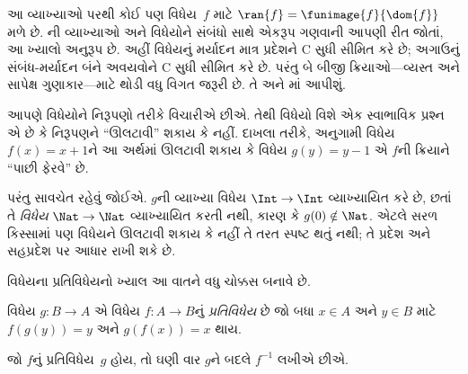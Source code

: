\begin{explain}
આ વ્યાખ્યાઓ પરથી કોઈ પણ વિધેય~$f$ માટે
$\ran{f} =
\funimage{f}{\dom{f}}$ મળે છે.
ની
વ્યાખ્યાઓ અને વિધેયોને સંબંધો સાથે એકરૂપ ગણવાની આપણી
રીત જોતાં, આ ખ્યાલો અનુરૂપ છે. અહીં વિધેયનું મર્યાદન
માત્ર પ્રદેશને C સુધી સીમિત કરે છે; અગાઉનું સંબંધ-મર્યાદન
બંને અવયવોને C સુધી સીમિત કરે છે. પરંતુ બે બીજી
ક્રિયાઓ---વ્યસ્ત અને સાપેક્ષ ગુણાકાર---માટે થોડી વધુ
વિગત જરૂરી છે. તે  અને
માં આપીશું.
\end{explain}
\endgroup


\begingroup
\makeatletter{}\makeatother

\label{guunit:OLP-0024}


\begin{explain}
આપણે વિધેયોને નિરૂપણો તરીકે વિચારીએ છીએ. તેથી વિધેયો
વિશે એક સ્વાભાવિક પ્રશ્ન એ છે કે નિરૂપણને “ઊલટાવી”
શકાય કે નહીં. દાખલા તરીકે, અનુગામી વિધેય
$f(x) = x + 1$ને આ અર્થમાં ઊલટાવી શકાય કે વિધેય
$g(y) = y - 1$ એ $f$ની ક્રિયાને “પાછી ફેરવે” છે.

પરંતુ સાવચેત રહેવું જોઈએ. $g$ની વ્યાખ્યા વિધેય
$\Int \to \Int$ વ્યાખ્યાયિત કરે છે, છતાં તે
\emph{વિધેય} $\Nat
\to \Nat$ વ્યાખ્યાયિત કરતી નથી, કારણ કે
$g(0) \notin \Nat$. એટલે સરળ કિસ્સામાં પણ વિધેયને
ઊલટાવી શકાય કે નહીં તે તરત સ્પષ્ટ થતું નથી;
તે પ્રદેશ અને સહપ્રદેશ પર આધાર રાખી શકે છે.

વિધેયના પ્રતિવિધેયનો ખ્યાલ આ વાતને વધુ ચોક્કસ બનાવે છે.
\end{explain}

\begin{defn}
વિધેય $g \colon B \to A$ એ વિધેય $f
\colon A \to B$નું \emph{પ્રતિવિધેય} છે જો બધા
$x \in A$ અને $y \in B$ માટે
$f(g(y)) = y$ અને $g(f(x)) = x$ થાય.
\end{defn}

જો $f$નું પ્રતિવિધેય~$g$ હોય, તો ઘણી વાર $g$ને
બદલે $f^{-1}$ લખીએ છીએ.

